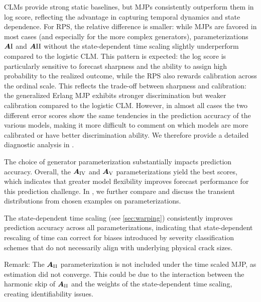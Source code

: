 CLMs provide strong static baselines, but MJPs consistently outperform them in log score, reflecting the advantage in capturing temporal dynamics and state dependence. For RPS, the relative difference is smaller: while MJPs are favored in most cases (and especially for the more complex generators), parameterizations $\bm{A}{\RN{1}}$ and $\bm{A}{\RN{2}}$ without the state-dependent time scaling slightly underperform compared to the logistic CLM.
This pattern is expected: the log score is particularly sensitive to forecast sharpness and the ability to assign high probability to the realized outcome, while the RPS also rewards calibration across the ordinal scale. 
This reflects the trade-off between sharpness and calibration: the generalized Erlang MJP exhibits stronger discrimination but weaker calibration compared to the logistic CLM.
However, in almost all cases the two different error scores show the same tendencies in the prediction accuracy of the various models, making it more difficult to comment on which models are more calibrated or have better discrimination ability. We therefore provide a detailed diagnostic analysis in .

The choice of generator parameterization substantially impacts prediction accuracy. 
Overall, the $\bm{A}_{\RN{4}}$ and $\bm{A}_{\RN{5}}$ parameterizations yield the best scores, which indicates that greater model flexibility improves forecast performance for this prediction challenge.
In , we further compare and discuss the transient distributions from chosen examples on parameterizations.

The state-dependent time scaling (see \cref{sec:warping}) consistently improves prediction accuracy across all parameterizations, indicating that state-dependent rescaling of time can correct for biases introduced by severity classification schemes that do not necessarily align with underlying physical crack sizes. 

Remark: The $\bm{A}_{\RN{2}}$ parameterization is not included under the time scaled MJP, as estimation did not converge. This could be due to the interaction between the harmonic skip of $\bm{A}_{\RN{2}}$ and the weights of the state-dependent time scaling, creating identifiability issues.

